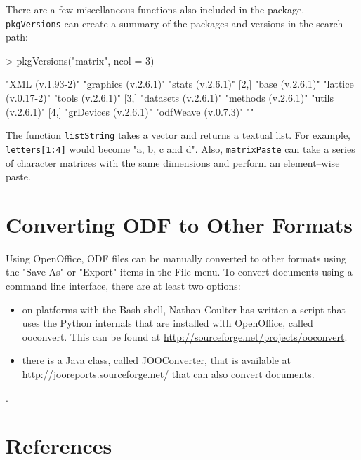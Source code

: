 \documentclass[12pt]{article}
\begin{document}
There are a few miscellaneous functions also included in the package. \texttt{pkgVersions} can create a summary of the packages and versions in the search path:
\begin{Schunk}
\begin{Sinput}
> pkgVersions("matrix", ncol = 3)
\end{Sinput}
\begin{Soutput}
     [,1]                  [,2]                 [,3]             
[1,] "XML (v.1.93-2)"      "graphics (v.2.6.1)" "stats (v.2.6.1)"
[2,] "base (v.2.6.1)"      "lattice (v.0.17-2)" "tools (v.2.6.1)"
[3,] "datasets (v.2.6.1)"  "methods (v.2.6.1)"  "utils (v.2.6.1)"
[4,] "grDevices (v.2.6.1)" "odfWeave (v.0.7.3)" ""               
\end{Soutput}
\end{Schunk}
The function \texttt{listString} takes a vector and returns a textual list. For example,  \verb|letters[1:4]| would become "a, b, c and d". Also, \texttt{matrixPaste} can take a series of character matrices with the same dimensions and perform an element--wise paste.

\section{Converting ODF to Other Formats}

Using OpenOffice, ODF files can be manually converted to other formats using the  "Save As" or "Export" items in the File menu. To convert documents using a command line interface, there are at least two options:
\begin{itemize}
\item on platforms with the Bash shell, Nathan Coulter has written a script that uses the Python internals that are installed with OpenOffice, called ooconvert. This can be found at \linebreak \href{http://sourceforge.net/projects/ooconvert} {http://sourceforge.net/projects/ooconvert}.
\item there is a Java class, called  JOOConverter, that is available at \href{http://jooreports.sourceforge.net/} {http://jooreports.sourceforge.net/} that can also convert documents.
\end{itemize}.



\section{References}
\end{document}
